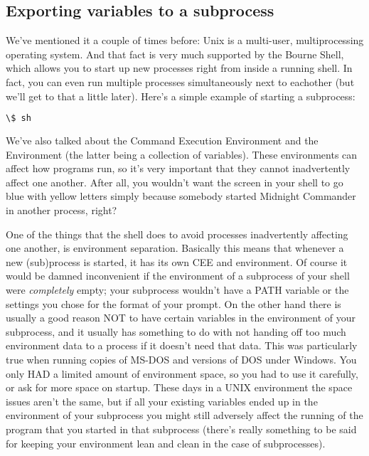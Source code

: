 \subsection{Exporting variables to a subprocess}
We've mentioned it a couple of times before: Unix is a multi-user,
multiprocessing operating system. And that fact is very much supported by the
Bourne Shell, which allows you to start up new processes right from inside a
running shell. In fact, you can even run multiple processes simultaneously next
to eachother (but we'll get to that a little later). Here's a simple example of
starting a subprocess: 
\lstset{basicstyle=\scriptsize, numbers=left, captionpos=b, tabsize=4}
\begin{lstlisting}[caption=Starting a new shell from the shell,language={bash},
xleftmargin=15pt, label=lst:Starting a new shell from the shell]
\$ sh
\end{lstlisting}

We've also talked about the Command Execution Environment and the Environment
(the latter being a collection of variables). These environments can affect how
programs run, so it's very important that they cannot inadvertently affect one
another. After all, you wouldn't want the screen in your shell to go blue with
yellow letters simply because somebody started Midnight Commander in another
process, right? 

One of the things that the shell does to avoid processes inadvertently
affecting one another, is environment separation. Basically this means that
whenever a new (sub)process is started, it has its own CEE and environment. Of
course it would be damned inconvenient if the environment of a subprocess of
your shell were \textit{completely} empty; your subprocess wouldn't have a PATH
variable or the settings you chose for the format of your prompt. On the other
hand there is usually a good reason NOT to have certain variables in the
environment of your subprocess, and it usually has something to do with not
handing off too much environment data to a process if it doesn't need that
data. This was particularly true when running copies of MS-DOS and versions of
DOS under Windows. You only HAD a limited amount of environment space, so you
had to use it carefully, or ask for more space on startup. These days in a UNIX
environment the space issues aren't the same, but if all your existing
variables ended up in the environment of your subprocess you might still
adversely affect the running of the program that you started in that subprocess
(there's really something to be said for keeping your environment lean and
clean in the case of subprocesses).

